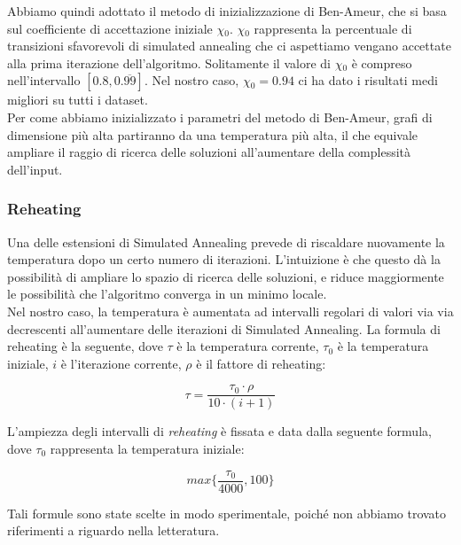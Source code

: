 \noindent Abbiamo quindi adottato il metodo di inizializzazione di Ben-Ameur, che si basa sul coefficiente di accettazione iniziale $\chi{}_0$. $\chi{}_0$ rappresenta la percentuale di transizioni sfavorevoli di simulated annealing che ci aspettiamo vengano accettate alla prima iterazione dell'algoritmo. Solitamente il valore di $\chi{}_0$ è compreso nell'intervallo $[0.8, 0.\overline{99}]$. Nel nostro caso, $\chi{}_0 = 0.94$ ci ha dato i risultati medi migliori su tutti i dataset. \\

\noindent Per come abbiamo inizializzato i parametri del metodo di Ben-Ameur, grafi di dimensione più alta partiranno da una temperatura più alta, il che equivale ampliare il raggio di ricerca delle soluzioni all'aumentare della complessità dell'input.

\subsubsection{Reheating}

Una delle estensioni di Simulated Annealing prevede di riscaldare nuovamente la temperatura dopo un certo numero di iterazioni. L'intuizione è che questo dà la possibilità di ampliare lo spazio di ricerca delle soluzioni, e riduce maggiormente le possibilità che l'algoritmo converga in un minimo locale. \\

\noindent Nel nostro caso, la temperatura è aumentata ad intervalli regolari di valori via via decrescenti all'aumentare delle iterazioni di Simulated Annealing. La formula di reheating è la seguente, dove $\tau{}$ è la temperatura corrente, $\tau{}_0$ è la temperatura iniziale, $i$ è l'iterazione corrente, $\rho$ è il fattore di reheating:

\begin{equation}
    \tau{} = \frac{\tau{}_0 \cdot \rho{}}{10 \cdot (i + 1)}
\end{equation}

L'ampiezza degli intervalli di \textit{reheating} è fissata e data dalla seguente formula, dove $\tau{}_0$ rappresenta la temperatura iniziale:

\begin{equation}
    max\{ \frac{\tau{}_0}{4000}, 100 \}
\end{equation}

\noindent Tali formule sono state scelte in modo sperimentale, poiché non abbiamo trovato riferimenti a riguardo nella letteratura.

